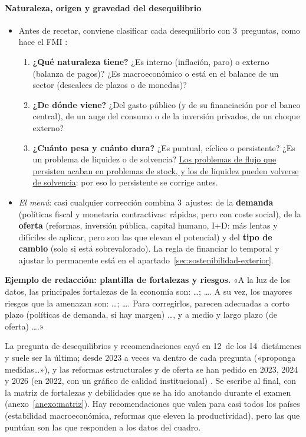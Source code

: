 \documentclass[11pt]{article}
\begin{document}
\paragraph{Naturaleza, origen y gravedad del desequilibrio}
\begin{itemize}
\item Antes de recetar, conviene clasificar cada desequilibrio con 3~preguntas, como hace el FMI \parencite{FMI2013CaseStudy}:
  \begin{enumerate}
  \item \textbf{¿Qué naturaleza tiene?} ¿Es interno (inflación, paro) o externo (balanza de pagos)? ¿Es macroeconómico o está en el balance de un sector (descalces de plazos o de monedas)?
  \item \textbf{¿De dónde viene?} ¿Del gasto público (y de su financiación por el banco central), de un auge del consumo o de la inversión privados, de un choque externo?
  \item \textbf{¿Cuánto pesa y cuánto dura?} ¿Es puntual, cíclico o persistente? ¿Es un problema de liquidez o de solvencia? \uline{Los problemas de flujo que persisten acaban en problemas de stock, y los de liquidez pueden volverse de solvencia}: por eso lo persistente se corrige antes.
  \end{enumerate}
\item \emph{El menú}: casi cualquier corrección combina 3~ajustes: de la \textbf{demanda} (políticas fiscal y monetaria contractivas: rápidas, pero con coste social), de la \textbf{oferta} (reformas, inversión pública, capital humano, I+D: más lentas y difíciles de aplicar, pero son las que elevan el potencial) y del \textbf{tipo de cambio} (solo si está sobrevalorado). La regla de financiar lo temporal y ajustar lo permanente está en el apartado~\ref{sec:sostenibilidad-exterior}.
\end{itemize}

\begin{anotaciones}
\textbf{Ejemplo de redacción: plantilla de fortalezas y riesgos.}
«A la luz de los datos, las principales fortalezas de la economía son: \ldots; \ldots. A su vez, los mayores riesgos que la amenazan son: \ldots; \ldots. Para corregirlos, parecen adecuadas a corto plazo (políticas de demanda, si hay margen) \ldots, y a medio y largo plazo (de oferta) \ldots.»
\end{anotaciones}

\begin{notaopositor}
La pregunta de desequilibrios y recomendaciones cayó en 12~de los 14~dictámenes y suele ser la última; desde 2023 a veces va dentro de cada pregunta («proponga medidas…»), y las reformas estructurales y de oferta se han pedido en 2023, 2024 y 2026 (en 2022, con un gráfico de calidad institucional) \parencite{ATCEE2026Examenes}. Se escribe al final, con la matriz de fortalezas y debilidades que se ha ido anotando durante el examen (anexo~\ref{anexo:matriz}). Hay recomendaciones que valen para casi todos los países (estabilidad macroeconómica, reformas que eleven la productividad), pero las que puntúan son las que responden a los datos del cuadro.
\end{notaopositor}
\end{document}

